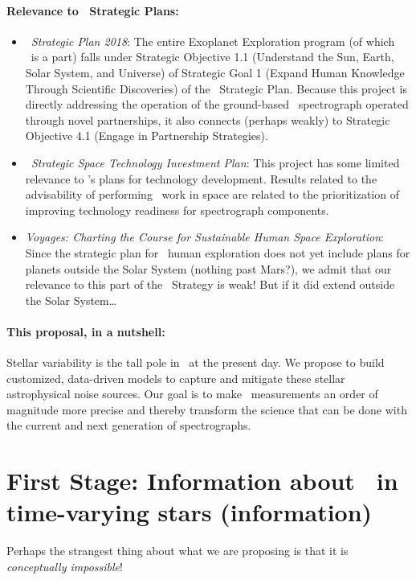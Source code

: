 \documentclass[12pt, letterpaper]{article}
\begin{document}
\paragraph{Relevance to \NASA\ Strategic Plans:}
\begin{itemize}
\item
\textit{\NASA\ Strategic Plan 2018}:
The entire Exoplanet Exploration program (of which \XRP\ is a part) falls under
Strategic Objective 1.1 (Understand the Sun, Earth, Solar System, and Universe)
of Strategic Goal 1 (Expand Human Knowledge Through Scientific Discoveries) of the
\NASA\ Strategic Plan.
Because this project is directly addressing the operation of the
ground-based \NNEXPLORE\ spectrograph operated through novel
partnerships, it also connects (perhaps weakly) to Strategic Objective
4.1 (Engage in Partnership Strategies).
\item
\textit{\NASA\ Strategic Space Technology Investment Plan}:
This project has some limited relevance to \NASA's plans for technology development.
Results related to the advisability of performing \EPRV\ work in space are related to
the prioritization of improving technology readiness for spectrograph components.
\item
\textit{Voyages: Charting the Course for Sustainable Human Space
  Exploration}: Since the strategic plan for \NASA\ human exploration
does not yet include plans for planets outside the Solar System
(nothing past Mars?), we admit that our relevance to this part of the
\NASA\ Strategy is weak! But if it did extend outside the Solar System\ldots
\end{itemize}

\paragraph{This proposal, in a nutshell:}
Stellar variability is the tall pole in \EPRV\ at the present day.
We propose to build customized, data-driven models to capture and mitigate these
stellar astrophysical noise sources.
Our goal is to make \EPRV\ measurements an order of magnitude more precise
and thereby transform the science
that can be done with the current and next generation of spectrographs.

\section{First Stage: Information about \EPRV\ in time-varying stars (information)}

Perhaps the strangest thing about what we are proposing is that
it is \emph{conceptually impossible}!
\end{document}
